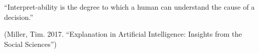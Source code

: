 \begin{frame}[fragile]\frametitle{}


\begin{center}
``Interpret-ability is the degree to which a human can 
understand the cause of a decision.''
\end{center}


\tiny{(Miller, Tim. 2017. ``Explanation in Artificial Intelligence: Insights from the Social Sciences'')}

\end{frame}
